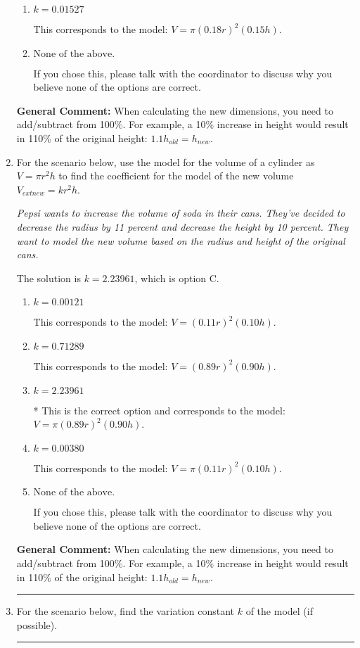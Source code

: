 \documentclass{extbook}[14pt]
\newcommand{\litem}[1]{\item #1

\rule{\textwidth}{0.4pt}}
\begin{document}
\begin{enumerate}
{\begin{enumerate}[label=\Alph*.]
* This is the correct option and corresponds to the model: $V = \pi (0.82 r)^2 (0.85 h)$.
\item \( k = 0.01527 \)

This corresponds to the model: $V = \pi (0.18 r)^2 (0.15 h)$.
\item \( \text{None of the above.} \)

If you chose this, please talk with the coordinator to discuss why you believe none of the options are correct.
\end{enumerate}

\textbf{General Comment:} When calculating the new dimensions, you need to add/subtract from 100\%. For example, a 10\% increase in height would result in 110\% of the original height: $1.1h_{old} = h_{new}$.
}
\litem{
For the scenario below, use the model for the volume of a cylinder as $V = \pi r^2 h$ to find the coefficient for the model of the new volume $V_{	ext{new}} = k r^2 h$.

\begin{center}
    \textit{ Pepsi wants to increase the volume of soda in their cans. They've decided to decrease the radius by 11 percent and decrease the height by 10 percent. They want to model the new volume based on the radius and height of the original cans. }
\end{center}


The solution is \( k = 2.23961 \), which is option C.\begin{enumerate}[label=\Alph*.]
\item \( k = 0.00121 \)

This corresponds to the model: $V = (0.11 r)^2 (0.10 h)$.
\item \( k = 0.71289 \)

This corresponds to the model: $V = (0.89 r)^2 (0.90 h)$.
\item \( k = 2.23961 \)

* This is the correct option and corresponds to the model: $V = \pi (0.89 r)^2 (0.90 h)$.
\item \( k = 0.00380 \)

This corresponds to the model: $V = \pi (0.11 r)^2 (0.10 h)$.
\item \( \text{None of the above.} \)

If you chose this, please talk with the coordinator to discuss why you believe none of the options are correct.
\end{enumerate}

\textbf{General Comment:} When calculating the new dimensions, you need to add/subtract from 100\%. For example, a 10\% increase in height would result in 110\% of the original height: $1.1h_{old} = h_{new}$.
}
\litem{
For the scenario below, find the variation constant $k$ of the model (if possible).

}
\end{enumerate}
\end{document}
